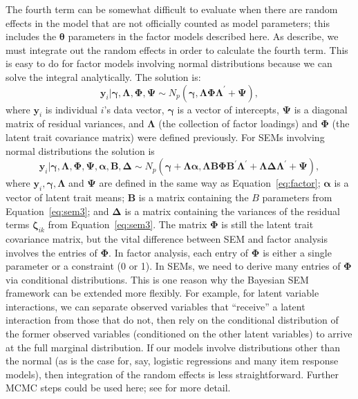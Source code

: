 The fourth term can be somewhat difficult to evaluate when there are random effects in the model that are not officially counted as model parameters; this includes the $\bm{\theta}$ parameters in the factor models described here. As  describe, we must integrate out the random effects in order to calculate the fourth term.  This is easy to do for factor models involving normal distributions because we can solve the integral analytically.  The solution is:
\begin{equation} \label{eq:factor}
    \bm{y}_i | \bm{\gamma}, \bm{\Lambda}, \bm{\Phi}, \bm{\Psi} \sim  N_p(\bm{\gamma}, \bm{\Lambda \Phi \Lambda}^\prime + \bm{\Psi}),
\end{equation}
where $\bm{y}_i$ is individual $i$'s data vector, $\bm{\gamma}$ is a vector of intercepts, $\bm{\Psi}$ is a diagonal matrix of residual variances, and $\bm{\Lambda}$ (the collection of factor loadings) and $\bm{\Phi}$ (the latent trait covariance matrix) were defined previously.  For SEMs involving normal distributions the solution is 
\begin{equation}
  \bm {y}_i | \bm \gamma, \bm \Lambda, \bm \Phi, \bm \Psi, \bm \alpha, \bm B, \bm \Delta \sim 
  N_p(\bm \gamma+\bm \Lambda \bm \alpha, \bm \Lambda \bm B \bm \Phi \bm{B}^\prime \bm{\Lambda}^\prime + \bm \Lambda \bm \Delta \bm
  \Lambda^{\prime} + \bm \Psi),
\end{equation}
where $\bm {y}_i, \bm \gamma, \bm \Lambda$ and $\bm \Psi$ are defined in the same way as Equation~\eqref{eq:factor}; $\bm \alpha$ is a vector of latent trait means; $\bm B$ is a matrix containing the $B$ parameters from Equation~\eqref{eq:sem3}; and $\bm \Delta$ is a matrix containing the variances of the residual terms $\bm \zeta_{ik}$ from Equation~\eqref{eq:sem3}.  The matrix $\bm \Phi$ is still the latent trait covariance matrix, but the vital difference between SEM and factor analysis involves the entries of $\bm \Phi$.  In factor analysis, each entry of $\bm \Phi$ is either a single parameter or a constraint (0 or 1).  In SEMs, we need to derive many entries of $\bm \Phi$ via conditional distributions.  This is one reason why the Bayesian SEM framework can be extended more flexibly. For example, for latent variable interactions, we can separate observed variables that ``receive'' a latent interaction from those that do not, then rely on the conditional distribution of the former observed variables (conditioned on the other latent variables) to arrive at the full marginal distribution. If our models involve distributions other than the normal (as is the case for, say, logistic regressions and many item response models), then integration of the random effects is less straightforward.  Further MCMC steps could be used here; see  for more detail.

